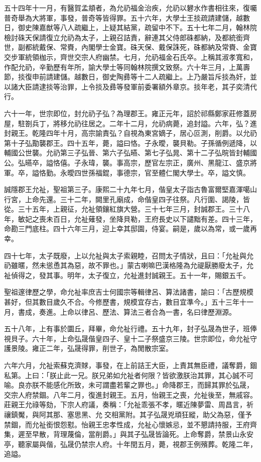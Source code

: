 \begin{pinyinscope}
五十四年十一月，有醫賀孟頫者，為允礽福金治疾，允礽以礬水作書相往來，復囑普奇舉為大將軍，事發，普奇等皆得罪。五十六年，大學士王掞疏請建儲，越數日，御史陳嘉猷等八人疏繼上，上疑其結黨，疏留中不下。五十七年二月，翰林院檢討硃天保請復立允礽為太子，上親召詰責，辭連其父侍郎硃都納，及都統銜齊世，副都統戴保、常賚，內閣學士金寶。硃天保、戴保誅死，硃都納及常賚、金寶交步軍統領枷示，齊世交宗人府幽禁。七月，允礽福金石氏卒。上稱其淑孝寬和，作配允礽，辛勤歷有年所，諭大學士等同翰林院撰文致祭。六十年三月，上萬壽節，掞復申前請建儲。越數日，御史陶彞等十二人疏繼上。上乃嚴旨斥掞為奸，並以諸大臣請逮掞等治罪，上令掞及彞等發軍前委署額外章京。掞年老，其子奕清代行。

六十一年，世宗即位，封允礽子弘？為理郡王。雍正元年，詔於祁縣鄭家莊修蓋房屋，駐劄兵丁，將移允礽往居之。二年十二月，允礽病薨，追封謚。六年，弘？進封親王。乾隆四年十月，高宗諭責弘？自視為東宮嫡子，居心叵測，削爵。以允礽第十子弘勩襲郡王。四十五年，薨，謚曰恪。子永曖，襲貝勒。子孫循例遞降，以輔國公世襲。允礽第三子弘晉、第六子弘曣、第七子弘晁、第十二子弘晥皆封輔國公。弘曣卒，謚恪僖。子永瑋，襲。事高宗，歷官左宗正，廣州、黑龍江、盛京將軍。卒，謚恪勤。永曖四世孫福錕，事德宗，官至體仁閣大學士。卒，謚文慎。

誠隱郡王允祉，聖祖第三子。康熙二十九年七月，偕皇太子詣古魯富爾堅嘉渾噶山行宮，上命先還。三十二年，闕里孔廟成，命偕皇四子往祭。凡行圍、謁陵，皆從。三十五年，上親征，允祉領鑲紅旗大營。三十七年三月，封誠郡王。三十八年，敏妃之喪未百日，允祉薙發，坐降貝勒，王府長史以下譴黜有差。四十三年，命勘三門底柱。四十六年三月，迎上幸其邸園，侍宴。嗣是，歲以為常，或一歲再幸。

四十七年，太子既廢，上以允祉與太子索親睦，召問太子情狀，且曰：「允祉與允礽雖暱，然未慫恿其為惡，故不罪也。」蒙古喇嘛巴漢格隆為允禔厭勝廢太子，允祉偵得之，發其事。明年，太子復立，允祉進封誠親王。五十一年，賜銀五千。

聖祖邃律歷之學，命允祉率庶吉士何國宗等輯律呂、算法諸書，諭曰：「古歷規模甚好，但其數目歲久不合。今修歷書，規模宜存古，數目宜準今。」五十三年十一月，書成，奏進。上命以律呂、歷法、算法三者合為一書，名曰律歷淵源。

五十八年，上有事於圜丘，拜畢，命允祉行禮。五十九年，封子弘晟為世子，班俸視貝子。六十年，上命弘晟偕皇四子、皇十二子祭盛京三陵。世宗即位，命允祉守護景陵。雍正二年，弘晟得罪，削世子，為閒散宗室。

六年六月，允祉索蘇克濟賕，事發，在上前詰王大臣，上責其無臣禮，議奪爵，錮私第。上曰：「朕止此一兄。朕兄弟如允祉者何限？皆欲激朕治其罪，其心誠不可喻。良亦朕不能感化所致，未可謂盡若輩之罪也。」命降郡王，而歸其罪於弘晟，交宗人府禁錮。八年二月，復進封親王。五月，怡親王之喪，允祉後至，無戚容。莊親王允祿等劾，下宗人府議，奏稱：「允祉乖張不孝，暱近陳夢雷、周昌言，祈禳鎮魘，與阿其那、塞思黑、允交相黨附。其子弘晟兇頑狂縱，助父為惡，僅予禁錮，而允祉銜恨怨懟。怡親王忠孝性成，允祉心懷嫉忌，並不懇請持服，王府齊集，遲至早散，背理蔑倫，當削爵。」與其子弘晟皆論死。上命奪爵，禁景山永安亭，聽家屬與偕，弘晟仍禁宗人府。十年閏五月，薨，視郡王例殯葬。乾隆二年，追謚。


\end{pinyinscope}
